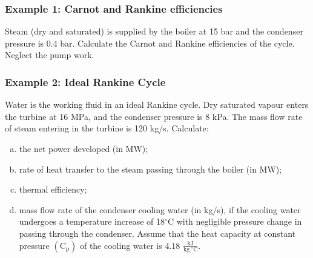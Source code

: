 \documentclass[10pt,compress]{beamer}
\begin{document}
\begin{frame}
\begin{columns}
\begin{column}[c]{0.5\linewidth}
{\begin{figure}
\begin{center}
           \end{center}
         \end{figure}}
      \end{column}
   \end{columns}
 \normalsize
\end{frame}


\begin{frame}
 \frametitle{Example 1: Carnot and Rankine efficiencies}
    Steam (dry and saturated) is supplied by the boiler at 15 bar and the condenser pressure is 0.4 bar. Calculate the Carnot and Rankine efficiencies of the cycle. Neglect the pump work.
\end{frame}

\begin{frame}
 \frametitle{Example 2: Ideal Rankine Cycle}
Water is the working fluid in an ideal Rankine cycle. Dry saturated vapour enters the turbine at 16 MPa, and the condenser pressure is 8 kPa. The mass flow rate of steam entering in the turbine is 120 kg/s. Calculate:
\begin{enumerate}[(a)]
\item the net power developed (in MW);
\item rate of heat transfer to the steam passing through the boiler (in MW);
\item thermal efficiency;
\item mass flow rate of the condenser cooling water (in kg/s), if the cooling water undergoes a temperature increase of 18$^{\circ}$C with negligible pressure change in passing through the condenser. Assume that the heat capacity at constant pressure $\left(\text{C}_{\text{p}}\right)$ of the cooling water is 4.18 $\frac{\text{kJ}}{\text{kg.}^{\circ}\text{C}}$.
\end{enumerate} 
\end{frame}
\end{document}
